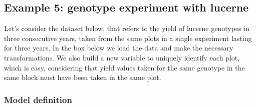 \documentclass[a4paper,12pt,oneside]{book}
\newenvironment{Shaded}{\begin{snugshade}}{\end{snugshade}}
\newcommand{\SpecialCharTok}[1]{#1}
\newcommand{\StringTok}[1]{#1}
\newcommand{\CommentTok}[1]{#1}
\newcommand{\DocumentationTok}[1]{#1}
\newcommand{\OtherTok}[1]{#1}
\newcommand{\FunctionTok}[1]{#1}
\newcommand{\NormalTok}[1]{#1}
\begin{document}
\hypertarget{example-5-genotype-experiment-with-lucerne}{%
\subsection{Example 5: genotype experiment with lucerne}\label{example-5-genotype-experiment-with-lucerne}}

Let's consider the dataset below, that refers to the yield of lucerne genotypes in three consecutive years, taken from the same plots in a single experiment lasting for three years. In the box below we load the data and make the necessary transformations. We also build a new variable to uniquely identify each plot, which is easy, considering that yield values taken for the same genotype in the same block must have been taken in the same plot.

\begin{Shaded}
\end{Shaded}

\hypertarget{model-definition-7}{%
\subsubsection{Model definition}\label{model-definition-7}}
\end{document}
